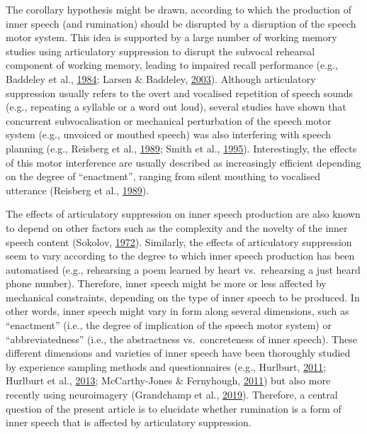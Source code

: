 \documentclass[a4paper,12pt,twoside,openright,oldfontcommands,final]{memoir}
\begin{document}
The corollary hypothesis might be drawn, according to which the production of inner speech (and rumination) should be disrupted by a disruption of the speech motor system. This idea is supported by a large number of working memory studies using articulatory suppression to disrupt the subvocal rehearsal component of working memory, leading to impaired recall performance (e.g., Baddeley et al., \protect\hyperlink{ref-baddeley_exploring_1984}{1984}; Larsen \& Baddeley, \protect\hyperlink{ref-larsen_disruption_2003}{2003}). Although articulatory suppression usually refers to the overt and vocalised repetition of speech sounds (e.g., repeating a syllable or a word out loud), several studies have shown that concurrent subvocalisation or mechanical perturbation of the speech motor system (e.g., unvoiced or mouthed speech) was also interfering with speech planning (e.g., Reisberg et al., \protect\hyperlink{ref-reisberg_enacted_1989}{1989}; Smith et al., \protect\hyperlink{ref-smith_role_1995}{1995}). Interestingly, the effects of this motor interference are usually described as increasingly efficient depending on the degree of \enquote{enactment}, ranging from silent mouthing to vocalised utterance (Reisberg et al., \protect\hyperlink{ref-reisberg_enacted_1989}{1989}).

The effects of articulatory suppression on inner speech production are also known to depend on other factors such as the complexity and the novelty of the inner speech content (Sokolov, \protect\hyperlink{ref-sokolov_inner_1972}{1972}). Similarly, the effects of articulatory suppression seem to vary according to the degree to which inner speech production has been automatised (e.g., rehearsing a poem learned by heart vs.~rehearsing a just heard phone number). Therefore, inner speech might be more or less affected by mechanical constraints, depending on the type of inner speech to be produced. In other words, inner speech might vary in form along several dimensions, such as \enquote{enactment} (i.e., the degree of implication of the speech motor system) or \enquote{abbreviatedness} (i.e., the abstractness vs.~concreteness of inner speech). These different dimensions and varieties of inner speech have been thoroughly studied by experience sampling methods and questionnaires (e.g., Hurlburt, \protect\hyperlink{ref-Hurlburt2011}{2011}; Hurlburt et al., \protect\hyperlink{ref-Hurlburt2013}{2013}; McCarthy-Jones \& Fernyhough, \protect\hyperlink{ref-McCarthy-Jones2011}{2011}) but also more recently using neuroimagery (Grandchamp et al., \protect\hyperlink{ref-grandchamp_neurocognitive_2019}{2019}). Therefore, a central question of the present article is to elucidate whether rumination is a form of inner speech that is affected by articulatory suppression.
\end{document}
